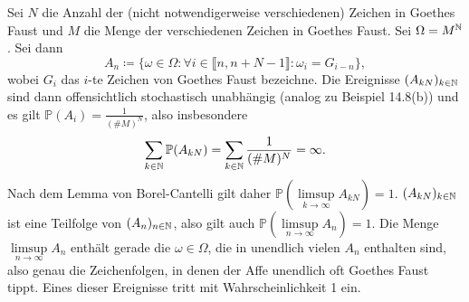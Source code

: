 \documentclass[uebung]{lecture}
\renewcommand{\P}{\mathbb{P}}
\begin{document}
\begin{aufgabe}
    Sei $N$ die Anzahl der (nicht notwendigerweise verschiedenen) Zeichen in Goethes Faust und $M$ die Menge der verschiedenen Zeichen in Goethes Faust. 
    Sei $\Omega = M^{\mathbb{N}}$.
    Sei dann 
    \[ 
        A_{n} \coloneqq \{\omega \in \Omega \colon \forall i \in \llbracket n, n+N-1 \rrbracket \colon \omega_i = G_{i-n}\},
    \]
    wobei $G_i$ das $i$-te Zeichen von Goethes Faust bezeichne.
    Die Ereignisse $(A_{kN})_{k\in \mathbb{N}}$ sind dann offensichtlich stochastisch unabhängig (analog zu Beispiel 14.8(b)) und es gilt 
    $\P(A_i) = \frac{1}{(\# M)^N}$, also insbesondere 
    \[
        \sum_{k\in \N} \P(A_{kN}) =  \sum_{k\in \N} \frac{1}{(\# M)^N} = \infty.
    \]
    Nach dem Lemma von Borel-Cantelli gilt daher $\P(\limsup\limits_{k \to \infty} A_{kN}) = 1$. $(A_{kN})_{k \in \mathbb{N}}$ ist eine Teilfolge von $(A_n)_{n\in \mathbb{N}}$, also gilt auch $\P(\limsup\limits_{n \to \infty} A_n) = 1$.
    Die Menge $\limsup\limits_{n \to \infty} A_n$ enthält gerade die $\omega \in \Omega$, die in unendlich vielen $A_n$ enthalten sind, also genau die Zeichenfolgen, in denen der Affe unendlich oft Goethes Faust tippt. Eines dieser Ereignisse tritt mit Wahrscheinlichkeit 1 ein.
\end{aufgabe}
\end{document}
